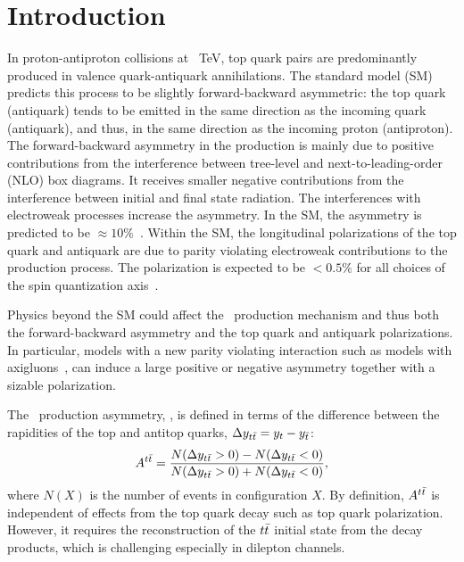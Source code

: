 \documentclass[aps,prd,twocolumn,showpacs,superscriptaddress,groupedaddress,floatfix]{revtex4}
\begin{document}

\maketitle




\makeatletter{}
\section{Introduction}
\label{sec:introduction}

In proton-antiproton collisions at ~TeV,
top quark pairs are predominantly produced in valence quark-antiquark annihilations.
The standard model (SM) predicts this
process to be slightly forward-backward asymmetric: the
top quark (antiquark) tends to be emitted in the same direction as the incoming quark (antiquark), and thus,
in the same direction as the incoming proton (antiproton).
The forward-backward asymmetry in the production is mainly due to  positive contributions from the interference between tree-level  and next-to-leading-order (NLO) box diagrams. It receives smaller negative
contributions from the interference between initial and final state radiation. The interferences with electroweak processes increase the asymmetry. 
In the SM, the asymmetry is predicted to be $\approx 10\%$~\cite{Bernreuther:2012ny,Czakon:2014xsa,Kidonakis:2015ona}.
Within the SM, the longitudinal polarizations of the top quark and antiquark
are due to parity violating electroweak contributions to the production process. The polarization is expected to be
$<0.5\%$ for all choices of the spin quantization axis~\cite{Bernreuther:2006vg,Bernreuther:2008ju}.


Physics beyond the SM could affect the \ttbar\ production mechanism and thus both the forward-backward asymmetry and the top quark and antiquark polarizations.
In particular, models with a new  parity violating interaction such as models with axigluons~\cite{Frampton1987157,axi2,axi3,Frampton:2009rk}, can induce a large positive or negative asymmetry together with a sizable polarization.


The \ttbar\ production asymmetry, \Att, is defined in terms of the difference between the rapidities of the top and antitop quarks, $\Delta y_{t\bar{t}}= y_t- y_{\bar t}$:
\begin{equation}A^{t\bar t}= \frac { N ( \Delta y_{t\bar{t}}>0) - N ( \Delta y_{t\bar{t}} <0) }{ N ( \Delta y_{t\bar{t}}>0) + N ( \Delta y_{t\bar{t}} <0) },\end{equation} where 
$N(X)$ is the number of events in configuration $X$.
By definition, $A^{t\bar t}$ is independent of effects from the top quark decay such as 
top quark polarization. However, it  requires  the reconstruction of the $t\bar{t}$ initial state from the decay products, which is challenging especially in dilepton channels.
\end{document}
